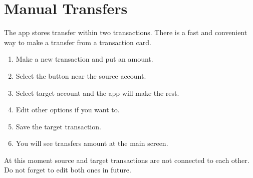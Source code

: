 \documentclass[a4paper,10pt,english]{sphinxmanual}
\begin{document}
\section{Manual Transfers}
\label{\detokenize{transactions:manual-transfers}}
The app stores transfer within two transactions. There is a fast and convenient way to make
a transfer from a transaction card.
\begin{enumerate}
\def\theenumi{\arabic{enumi}}
\def\labelenumi{\theenumi .}
\makeatletter\def\p@enumii{\p@enumi \theenumi .}\makeatother
\item {} 
Make a new transaction and put an amount.

\item {} 
Select the  button near the source account.

\item {} 
Select target account and the app will make the rest.

\item {} 
Edit other options if you want to.

\item {} 
Save the target transaction.

\item {} 
You will see transfers amount at the main screen.

\end{enumerate}

\noindent{}

\noindent{}

\noindent{}

\noindent{}

\noindent{}

\noindent{}

\noindent{}

At this moment source and target transactions are not connected to each other.
Do not forget to edit both ones in future.
\end{document}
